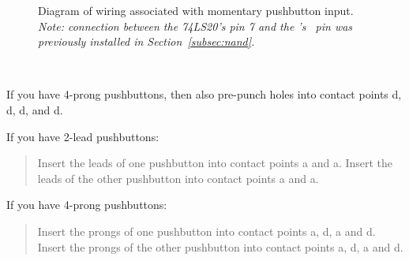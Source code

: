 \begin{figure}
    \centering
    \hfil
    \caption{Diagram of wiring associated with momentary pushbutton input.
        \textit{Note: connection between the 74LS20's pin 7 and the \developmentboard's
        \mcubuttonnand\ pin was previously installed in Section~\ref{subsec:nand}.}
        \label{fig:pushbutton-diagram}}
\end{figure}

\disconnect\

If you have 4-prong pushbuttons, then also pre-punch holes into contact points d, d, d, and d.

If you have 2-lead pushbuttons:
\begin{quote}
    Insert the leads of one pushbutton into contact points a and a.
    Insert the leads of the other pushbutton into contact points a and a.
\end{quote}

If you have 4-prong pushbuttons:
\begin{quote}
    Insert the prongs of one pushbutton into contact points a, d, a and d.
    Insert the prongs of the other pushbutton into contact points a, d, a and d.
\end{quote}

